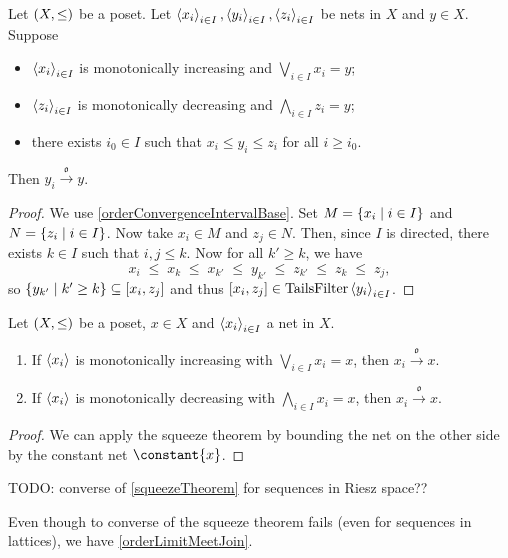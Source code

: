 \begin{proposition} \label{squeezeTheorem}
Let $\sSet{X,\leq}$ be a poset. Let $\left\langle x_i \right\rangle_{i\in I}, \left\langle y_i \right\rangle_{i\in I},\left\langle z_i \right\rangle_{i\in I}$ be nets in $X$ and $y\in X$.
Suppose
\begin{itemize}
\item $\left\langle x_i \right\rangle_{i\in I}$ is monotonically increasing and $\bigvee_{i\in I}x_i = y$;
\item $\left\langle z_i \right\rangle_{i\in I}$ is monotonically decreasing and $\bigwedge_{i\in I}z_i = y$;
\item there exists $i_0\in I$ such that $x_i \leq y_i \leq z_i$ for all $i\geq i_0$.
\end{itemize}
Then $y_i \overset{\mathfrak{o}}{\longrightarrow} y$.
\end{proposition}
\begin{proof}
We use \ref{orderConvergenceIntervalBase}. Set $M = \setbuilder{x_i}{i\in I}$ and $N = \setbuilder{z_i}{i\in I}$. Now take $x_i\in M$ and $z_j\in N$. Then, since $I$ is directed, there exists $k\in I$ such that $i,j\leq k$. Now for all $k'\geq k$, we have
\[ x_i \;\leq\; x_k \;\leq\; x_{k'} \;\leq\; y_{k'} \;\leq\; z_{k'} \;\leq\; z_k \;\leq\; z_j, \]
so $\setbuilder{y_{k'}}{k'\geq k} \subseteq \interval{x_i, z_j}$ and thus $\interval{x_i, z_j}\in\TailsFilter\seq{y_i}_{i\in I}$.
\end{proof}
\begin{corollary}
Let $\sSet{X,\leq}$ be a poset, $x\in X$ and $\left\langle x_i \right\rangle_{i\in I}$ a net in $X$.
\begin{enumerate}
\item If $\left\langle x_i \right\rangle$ is monotonically increasing with $\bigvee_{i\in I}x_i = x$, then $x_i \overset{\mathfrak{o}}{\longrightarrow} x$.
\item If $\left\langle x_i \right\rangle$ is monotonically decreasing with $\bigwedge_{i\in I}x_i = x$, then $x_i \overset{\mathfrak{o}}{\longrightarrow} x$.
\end{enumerate}
\end{corollary}
\begin{proof}
We can apply the squeeze theorem by bounding the net on the other side by the constant net $\constant{x}$.
\end{proof}
TODO: converse of \ref{squeezeTheorem} for sequences in Riesz space??

Even though to converse of the squeeze theorem fails (even for sequences in lattices), we have \ref{orderLimitMeetJoin}.


